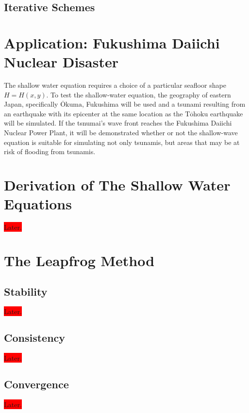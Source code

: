 \documentclass[../main.tex]{subfiles}
\begin{document}
\subsection{Iterative Schemes}

\section{Application: Fukushima Daiichi Nuclear Disaster}
The shallow water equation requires a choice of a particular seafloor shape $H=H(x,y)$. To test the shallow-water equation, the geography of eastern Japan, specifically $\overline{\text{O}}\text{kuma}$, Fukushima will be used and a tsunami resulting from an earthquake with its epicenter at the same location as the $\text{T}\overline{\text{o}}\text{hoku}$ earthquake will be simulated. If the tsnumai's wave front reaches the Fukushima Daiichi Nuclear Power Plant, it will be demonstrated whether or not the shallow-wave equation is suitable for simulating not only tsunamis, but areas that may be at risk of flooding from tsunamis.

\appendix
\section{Derivation of The Shallow Water Equations}\label{a:deriv}
\colorbox{red}{Later.}
\section{The Leapfrog Method}
\subsection{Stability}
\colorbox{red}{Later.}
\subsection{Consistency}
\colorbox{red}{Later.}
\subsection{Convergence}
\colorbox{red}{Later.}
\end{document}
